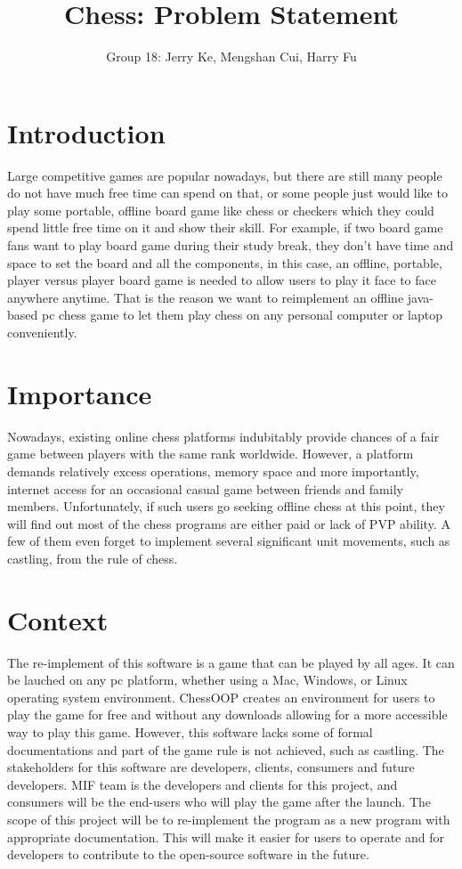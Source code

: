 \documentclass[12pt,letterpaper]{article}
\title{Chess: Problem Statement}
\author{Group 18: Jerry Ke, Mengshan Cui, Harry Fu}
\date{}
\begin{document}
\maketitle
\section{Introduction}
Large competitive games are popular nowadays, but there are still many people do not have much free time can spend on that, or some people just would like to play some portable, offline board game like chess or checkers which they could spend little free time on it and show their skill. For example, if two board game fans want to play board game during their study break, they don’t have time and space to set the board and all the components, in this case, an offline, portable, player versus player board game is needed to allow users to play it face to face anywhere anytime. That is the reason we want to reimplement an offline java-based pc chess game to let them play chess on any personal computer or laptop conveniently. 
\section{Importance}
Nowadays, existing online chess platforms indubitably provide chances of a fair game between players with the same rank worldwide. However, a platform demands relatively excess operations, memory space and more importantly, internet access for an occasional casual game between friends and family members. 
Unfortunately, if such users go seeking offline chess at this point, they will find out most of the chess programs are either paid or lack of PVP ability. A few of them even forget to implement several significant unit movements, such as castling, from the rule of chess. 

\section{Context}
The re-implement of this software is a game that can be played by all ages. It can be lauched on any pc platform, whether using a Mac, Windows, or Linux operating system environment. ChessOOP creates an environment for users to play the game for free and without any downloads allowing for a more accessible way to play this game. However, this software lacks some of formal documentations and part of the game rule is not achieved, such as castling. The stakeholders for this software are developers, clients, consumers and future developers. MIF team is the developers and clients for this project, and consumers will be the end-users who will play the game after the launch. The scope of this project will be to re-implement the program as a new program with appropriate documentation. This will make it easier for users to operate and for developers to contribute to the open-source software in the future.

\end{document}
